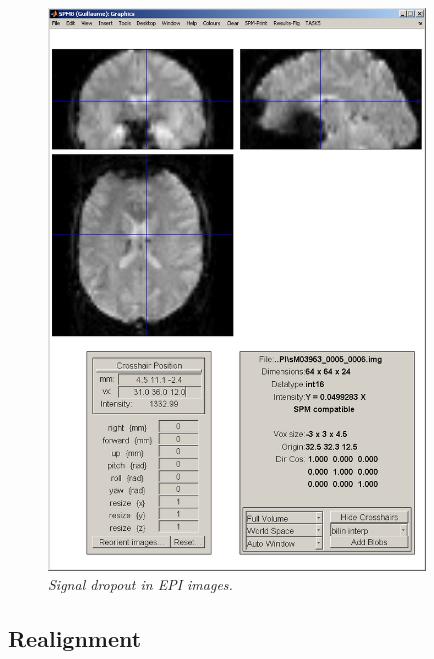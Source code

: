 \begin{figure}
\begin{center}
\includegraphics[width=100mm]{faces/dropout}
\caption{\em Signal dropout in EPI images. \label{dropout}}
\end{center}
\end{figure}

\subsection{Realignment}


